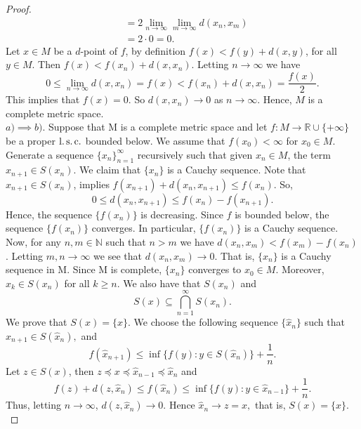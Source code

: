 \begin{proof}
\begin{align*}
            &= 2 \lim_{n \to \infty} \lim_{m \to \infty} d(x_n, x_m) \\
            &= 2 \cdot 0 = 0.
        \end{align*}
        Let $x \in M$ be a $d$-point of $f$, by definition 
        $f(x) < f(y) + d(x, y)$, for all $y \in M$. Then 
        $f(x) < f(x_n) + d(x, x_n)$. Letting $n \to \infty $ we have
        $$
            0 \leq \lim_{n \to \infty} d(x, x_n) = f(x) < f(x_n) + d(x, x_n) = %
                \frac{f(x)}{2}.
        $$
        This implies that $f(x) = 0$. So $d(x, x_n) \to 0$ as $n \to \infty$. 
        Hence, $M$ is a complete metric space. \\
        $a) \implies b)$.
        Suppose that M is a complete metric space and let 
        $f: M \to \mathbb{R} \cup \{ + \infty\}$ be a proper $\operatorname{l.s.c.}$ bounded
        below. We assume that $f(x_0) <\infty$ for $x_0 \in M$. Generate a
        sequence $\{x_n\}_{n=1}^{\infty}$ recursively such that given 
        $x_n \in M$, the term $x_{n+1} \in S(x_n)$. We claim that $\{x_n\}$ is a
        Cauchy sequence. Note that $x_{n+1} \in S(x_n)$, implies 
        $f(x_{n+1}) + d(x_n, x_{n+1}) \leq f(x_n)$. So,
        $$
            0 \leq d(x_n, x_{n+1}) \leq f(x_n) - f(x_{n+1}).
        $$
        Hence, the sequence $\{f(x_n)\}$ is decreasing. Since $f$ is bounded
        below, the sequence $\{f(x_n)\}$ converges. In particular, $\{f(x_n)\}$
        is a Cauchy sequence. Now, for any $n,m \in \mathbb{N}$ such that
        $n > m$ we have $d(x_n, x_m) < f(x_m) - f(x_n)$. Letting $m,n \to \infty$
        we see that $d(x_n, x_m) \to 0$. 
        That is, $\{x_n\}$ is a Cauchy sequence in M. Since M is complete, 
        $\{x_n\}$ converges to $x_0 \in M$. Moreover, $x_k \in S(x_n)$ for all
        $k \geq n$. We also have that $S(x_n)$ and 
        $$
            S(x) \subseteq \bigcap_{n =1}^{\infty} S(x_n).
        $$
        We prove that $S(x) = \{x\}$. We choose the following sequence 
        $\{ \widehat{x}_{n} \}$ such that
        $
            \widehat{x}_{n+1} \in S(\widehat{x}_{n}),
        $
        and
        $$
            f(\widehat{x}_{n+1}) \leq \inf \{ f(y) : y \in S(\widehat{x}_{n}) \} %
                + \dfrac{1}{n}.
        $$
        Let $z \in S(x)$, then $z \preceq x \preceq \widehat{x}_{n-1} \preceq \widehat{x}_{n}$ and
        $$
            f(z) + d(z, \widehat{x}_{n}) \leq f(\widehat{x}_{n}) \leq %
            \inf \{f(y) : y \in \widehat{x}_{n-1}\} + \frac{1}{n}. 
        $$
        Thus, letting $n \to \infty$, $d(z, \widehat{x}_{n}) \to 0$. Hence
        $
            \widehat{x}_{n} \to z = x,
        $
        that is,
        $
            S(x) = \{x\}.
        $
    \end{proof}
